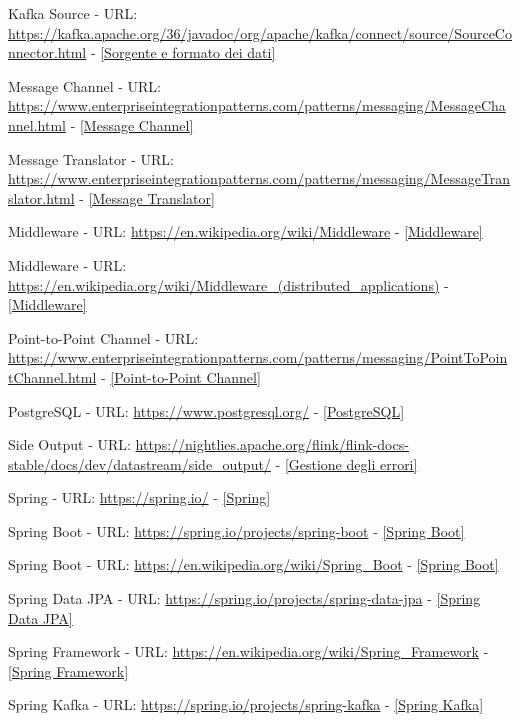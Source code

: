 \begin{description}
    \item Kafka Source - URL: \url{https://kafka.apache.org/36/javadoc/org/apache/kafka/connect/source/SourceConnector.html} - \ref{Sorgente e formato dei dati}
    \item Message Channel - URL: \url{https://www.enterpriseintegrationpatterns.com/patterns/messaging/MessageChannel.html} - \ref{Message Channel}
    \item Message Translator - URL: \url{https://www.enterpriseintegrationpatterns.com/patterns/messaging/MessageTranslator.html} - \ref{Message Translator}
    \item Middleware - URL: \url{https://en.wikipedia.org/wiki/Middleware} - \ref{Middleware}
    \item Middleware - URL: \url{https://en.wikipedia.org/wiki/Middleware_(distributed_applications)} - \ref{Middleware}
    \item Point-to-Point Channel - URL: \url{https://www.enterpriseintegrationpatterns.com/patterns/messaging/PointToPointChannel.html} - \ref{Point-to-Point Channel}
    \item PostgreSQL - URL: \url{https://www.postgresql.org/} - \ref{PostgreSQL}
    \item Side Output - URL: \url{https://nightlies.apache.org/flink/flink-docs-stable/docs/dev/datastream/side_output/} - \ref{Gestione degli errori}
    \item Spring - URL: \url{https://spring.io/} - \ref{Spring}
    \item Spring Boot - URL: \url{https://spring.io/projects/spring-boot} - \ref{Spring Boot}
    \item Spring Boot - URL: \url{https://en.wikipedia.org/wiki/Spring_Boot} - \ref{Spring Boot}
    \item Spring Data JPA - URL: \url{https://spring.io/projects/spring-data-jpa} - \ref{Spring Data JPA}
    \item Spring Framework - URL: \url{https://en.wikipedia.org/wiki/Spring_Framework} - \ref{Spring Framework}
    \item Spring Kafka - URL: \url{https://spring.io/projects/spring-kafka} - \ref{Spring Kafka}
\end{description}
\newpage
